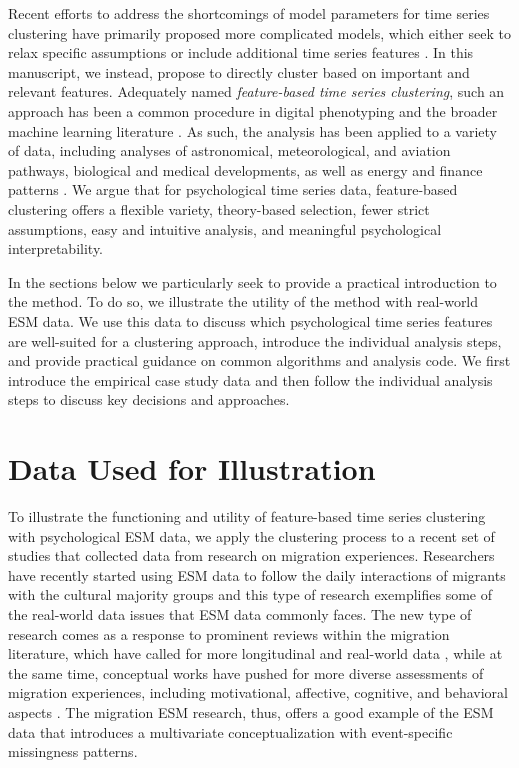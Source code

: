 \documentclass[man, 12pt, a4paper, mask, floatsintext]{apa7}
\theoremstyle{break}
\theoremstyle{plain}
\begin{document}
Recent efforts to address the shortcomings of model parameters for time series clustering have primarily proposed more complicated models, which either seek to relax specific assumptions \citep[e.g.,][]{denteuling2021} or include additional time series features \citep[e.g., see][]{krone2018}. In this manuscript, we instead, propose to directly cluster based on important and relevant features. Adequately named \textit{feature-based time series clustering}, such an approach has been a common procedure in digital phenotyping \citep[][]{loftus2022} and the broader machine learning literature \citep[][]{maharaj2019}. As such, the analysis has been applied to a variety of data, including analyses of astronomical, meteorological, and aviation pathways, biological and medical developments, as well as energy and finance patterns \citep{Aghabozorgi2015}. We argue that for psychological time series data, feature-based clustering offers a flexible variety, theory-based selection, fewer strict assumptions, easy and intuitive analysis, and meaningful psychological interpretability. 

In the sections below we particularly seek to provide a practical introduction to the method. To do so, we illustrate the utility of the method with real-world ESM data. We use this data to discuss which psychological time series features are well-suited for a clustering approach, introduce the individual analysis steps, and provide practical guidance on common algorithms and analysis code. We first introduce the empirical case study data and then follow the individual analysis steps to discuss key decisions and approaches.

\section{Data Used for Illustration}

To illustrate the functioning and utility of feature-based time series clustering with psychological ESM data, we apply the clustering process to a recent set of studies that collected data from research on migration experiences. Researchers have recently started using ESM data to follow the daily interactions of migrants with the cultural majority groups \citep[e.g.,][]{Keil2020} and this type of research exemplifies some of the real-world data issues that ESM data commonly faces. The new type of research comes as a response to prominent reviews within the migration literature, which have called for more longitudinal \citep[e.g.,][]{Ward2019} and real-world data \citep[e.g.,][]{McKeown2017}, while at the same time, conceptual works have pushed for more diverse assessments of migration experiences, including motivational, affective, cognitive, and behavioral aspects \citep[e.g.,][]{Kreienkamp2022d}. The migration ESM research, thus, offers a good example of the ESM data that introduces a multivariate conceptualization with event-specific missingness patterns.
\end{document}
